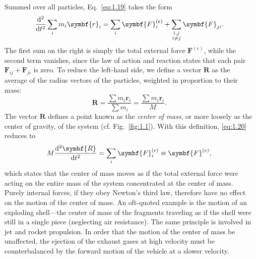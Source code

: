Summed over all particles, Eq.~\eqref{eq:1.19} takes the form
\begin{equation}
    \odv*[2]{\sum_im_i\symbf{r}_i}{t}=\sum_i\symbf{F}_i^{\left(e\right)}+\sum_{\substack{i,j\\i\ne j}}\symbf{F}_{ji}.\label{eq:1.20}
\end{equation}
The first sum on the right is simply the total external force \(\symbf{F}^{\left(e\right)}\), while the second term vanishes, since the law of action and reaction states that each pair \(\symbf{F}_{ij}+\symbf{F}_{ji}\) is zero. To reduce the left-hand side, we define a vector \(\symbf{R}\) as the average of the radius vectors of the particles, weighted in proportion to their mass:
\begin{equation}
    \symbf{R}=\frac{\sum m_i\symbf{r}_i}{\sum m_i}=\frac{\sum m_i\symbf{r}_i}{M}.\label{eq:1.21}
\end{equation}
The vector \(\symbf{R}\) defines a point known as the \emph{center of mass}, or more loosely as the center of gravity, of the system (cf. Fig.~\ref{fig:1.1}). With this definition, \eqref{eq:1.20} reduces to
\begin{equation}
    M\odv[2]{\symbf{R}}{t}=\sum_i\symbf{F}_i^{\left(e\right)}\equiv\symbf{F}^{\left(e\right)},\label{eq:1.22}
\end{equation}
which states that the center of mass moves as if the total external force were acting on the entire mass of the system concentrated at the center of mass. Purely internal forces, if they obey Newton's third law, therefore have no effect on the motion of the center of mass. An oft-quoted example is the motion of an exploding shell---the center of mass of the fragments traveling as if the shell were still in a single piece (neglecting air resistance). The same principle is involved in jet and rocket propulsion. In order that the motion of the center of mass be unaffected, the ejection of the exhaust gases at high velocity must be counterbalanced by the forward motion of the vehicle at a slower velocity.

